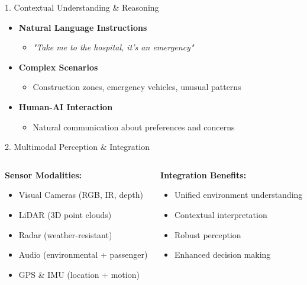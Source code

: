 \documentclass[aspectratio=169]{beamer}
\begin{document}
\begin{frame}{1. Contextual Understanding \& Reasoning}
    \begin{itemize}
        \item \textbf{Natural Language Instructions}
            \begin{itemize}
                \item \textit{"Take me to the hospital, it's an emergency"}
            \end{itemize}
        \item \textbf{Complex Scenarios}
            \begin{itemize}
                \item Construction zones, emergency vehicles, unusual patterns
            \end{itemize}
        \item \textbf{Human-AI Interaction}
            \begin{itemize}
                \item Natural communication about preferences and concerns
            \end{itemize}
    \end{itemize}
\end{frame}

\begin{frame}{2. Multimodal Perception \& Integration}
    \begin{columns}
        \begin{column}{0.5\textwidth}
            \textbf{Sensor Modalities:}
            \begin{itemize}
                \item Visual Cameras (RGB, IR, depth)
                \item LiDAR (3D point clouds)
                \item Radar (weather-resistant)
                \item Audio (environmental + passenger)
                \item GPS \& IMU (location + motion)
            \end{itemize}
        \end{column}
        \begin{column}{0.5\textwidth}
            \textbf{Integration Benefits:}
            \begin{itemize}
                \item Unified environment understanding
                \item Contextual interpretation
                \item Robust perception
                \item Enhanced decision making
            \end{itemize}
        \end{column}
    \end{columns}
\end{frame}
\end{document}
